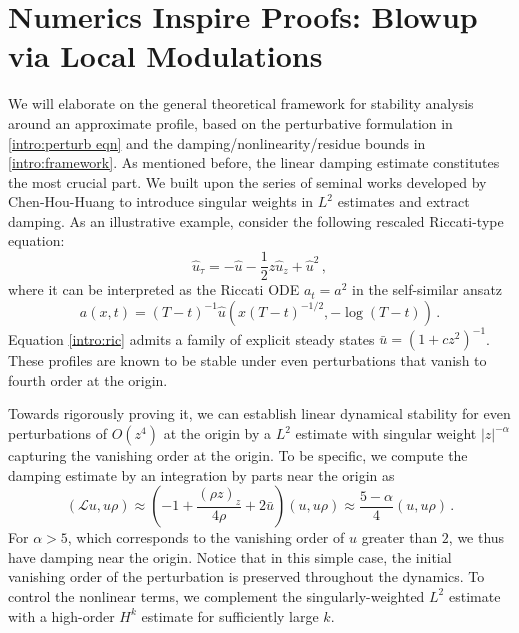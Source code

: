 \documentclass[12pt]{caltech_thesis}
\numberwithin{equation}{section}
\begin{document}
\section{Numerics Inspire Proofs: Blowup via Local Modulations}\label{sec:num1}
We will elaborate on the general theoretical framework for stability analysis around an approximate profile, based on the perturbative formulation in \eqref{intro:perturb eqn} and the damping/nonlinearity/residue bounds in \eqref{intro:framework}.
As mentioned before, the linear damping estimate constitutes the most crucial part. We built upon the series of seminal works developed by Chen-Hou-Huang \cite{chen2021finite,chen2019finite2,chen2020singularity,chen2022stable} to introduce singular weights in $L^2$ estimates and extract damping. As an illustrative example, consider the following rescaled Riccati-type equation:
\begin{equation}
\label{intro:ric}
\hat{u}_\tau=-\hat{u}-\frac{1}{2}z\hat{u}_z+\hat{u}^2\,,
\end{equation}
where it can be interpreted as the Riccati ODE $a_t=a^2$ in the self-similar ansatz $$a(x,t)=(T-t)^{-1}\hat{u}(x(T-t)^{-1/2},-\log(T-t))\,.$$
Equation \eqref{intro:ric} admits a family of explicit steady states $\bar{u}=(1+cz^2)^{-1}$. These profiles are known to be stable under even perturbations that vanish to fourth order at the origin.

 Towards rigorously proving it, we can establish linear dynamical stability for even perturbations of $O(z^4)$ at the origin by a $L^2$ estimate with singular weight $|z|^{-\alpha}$ capturing the vanishing order at the origin. To be specific,  we compute the damping estimate by an integration by parts near the origin as $$(\mathcal{L}u,u\rho)\approx(-1+\frac{(\rho z)_z}{4\rho}+2\bar{u})(u,u\rho)\approx\frac{5-\alpha}{4}(u,u\rho)\,.$$
For $\alpha>5$, which corresponds to the vanishing order of $u$ greater than $2$, we thus have damping near the origin. Notice that in this simple case, the initial vanishing order of the perturbation is preserved throughout the dynamics. To control the nonlinear terms, we complement the singularly-weighted $L^2$ estimate with a high-order $H^k$ estimate for sufficiently large $k$.
\end{document}
